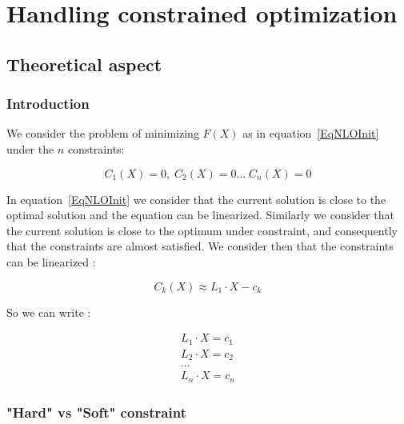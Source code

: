 \section{Handling constrained optimization}


\subsection{Theoretical aspect}


\subsubsection{Introduction}

We consider the problem of minimizing $F(X)$ as in equation~\ref{EqNLOInit} under
the $n$ constraints:

\begin{equation}
	C_1(X) =0, \; C_2(X)=0 \dots \;  C_n(X)=0
\end{equation}

In  equation~\ref{EqNLOInit} we consider that the current solution is
close to the optimal solution and the equation can be linearized.
Similarly we consider that the current solution is close to the 
optimum under constraint, and consequently that the constraints are almost satisfied.
We consider then that the constraints can be linearized :

\begin{equation} 
C_k(X) \approx L_1 \cdot X  - c_k
\end{equation} 

So we can write :

\begin{equation} 
\begin{split}
  L_1 \cdot X = c_1 \\
  L_2 \cdot X = c_2 \\
    \dots \\
  L_n \cdot X = c_n 
\end{split}
\end{equation}


\subsubsection{"Hard" vs "Soft" constraint}

